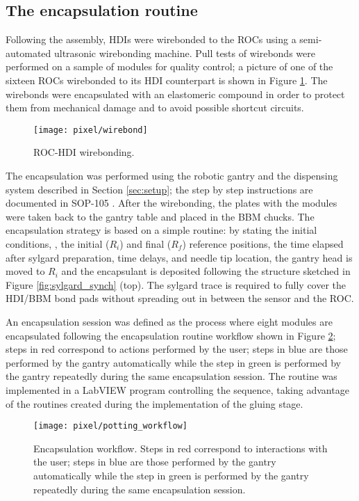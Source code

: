 \subsection{The encapsulation routine}

Following the assembly, HDIs were wirebonded to the ROCs using a semi-automated ultrasonic wirebonding machine. Pull tests of wirebonds were performed on a sample of modules for quality control; a picture of one of the sixteen ROCs wirebonded to its HDI counterpart is shown in Figure \ref{fig:wirebonds}. The wirebonds were encapsulated with an elastomeric compound in order to protect them from mechanical damage and to avoid possible shortcut circuits.

\begin{figure}[h]
\begin{center}
  \texttt{[image: pixel/wirebond]}
 \caption[ROC-HDI wirebonding.]{ROC-HDI wirebonding.}\label{fig:wirebonds}
\end{center}
\end{figure}

The encapsulation was performed using the robotic gantry and the dispensing system described in Section \ref{sec:setup}; the step by step instructions are documented in SOP-105 \cite{sop_105}. After the wirebonding, the plates with the modules were taken back to the gantry table and placed in the BBM chucks. The encapsulation strategy is based on a simple routine: by stating the initial conditions, \ie, the initial ($R_i$) and final ($R_f$) reference positions, the time elapsed after sylgard preparation, time delays, and needle tip location, the gantry head is moved to $R_i$ and the encapsulant is deposited following the structure sketched in Figure \ref{fig:sylgard_synch} (top). The sylgard trace is required to fully cover the HDI/BBM bond pads without spreading out in between the sensor and the ROC.

An encapsulation session was defined as the process where eight modules are encapsulated following the encapsulation routine workflow shown in Figure \ref{fig:potting_workflow}; steps in red correspond to actions performed by the user; steps in blue are those performed by the gantry automatically while the step in green is performed by the gantry repeatedly during the same encapsulation session. The routine was implemented in a LabVIEW program controlling the sequence, taking advantage of the routines created during the implementation of the gluing stage.   

\begin{figure}[h]
\begin{center}
  \texttt{[image: pixel/potting\_workflow]}
  \caption[Encapsulation workflow.]{Encapsulation workflow. Steps in red correspond to interactions with the user; steps in blue are those performed by the gantry automatically while the step in green is performed by the gantry repeatedly during the same encapsulation session.}\label{fig:potting_workflow}
\end{center}
\end{figure}

